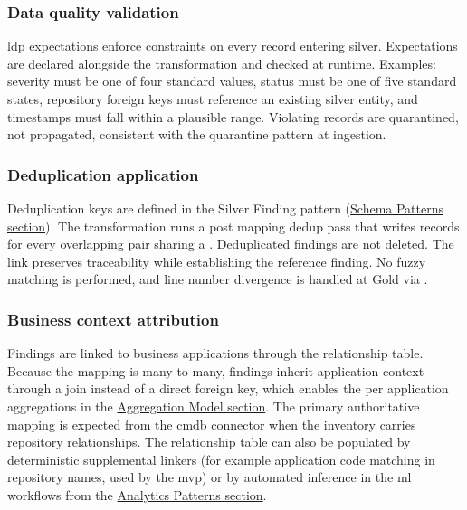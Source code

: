 \subsubsection{Data quality validation}

\Gls{ldp} expectations enforce constraints on every record entering silver. Expectations are declared alongside the transformation and checked at runtime. Examples: severity must be one of four standard values, status must be one of five standard states, repository foreign keys must reference an existing silver entity, and timestamps must fall within a plausible range. Violating records are quarantined, not propagated, consistent with the quarantine pattern at ingestion.

\subsubsection{Deduplication application}

Deduplication keys are defined in the Silver Finding pattern (\hyperref[sec:schema-patterns]{Schema Patterns section}). The transformation runs a post mapping dedup pass that writes  records for every overlapping pair sharing a . Deduplicated findings are not deleted. The link preserves traceability while establishing the reference finding. No fuzzy matching is performed, and line number divergence is handled at Gold via .

\subsubsection{Business context attribution}

Findings are linked to business applications through the  relationship table. Because the mapping is many to many, findings inherit application context through a join instead of a direct foreign key, which enables the per application aggregations in the \hyperref[sec:aggregation-model]{Aggregation Model section}. The primary authoritative mapping is expected from the \gls{cmdb} connector when the inventory carries repository relationships. The relationship table can also be populated by deterministic supplemental linkers (for example application code matching in repository names, used by the \gls{mvp}) or by automated inference in the \gls{ml} workflows from the \hyperref[sec:analytics-patterns]{Analytics Patterns section}.

